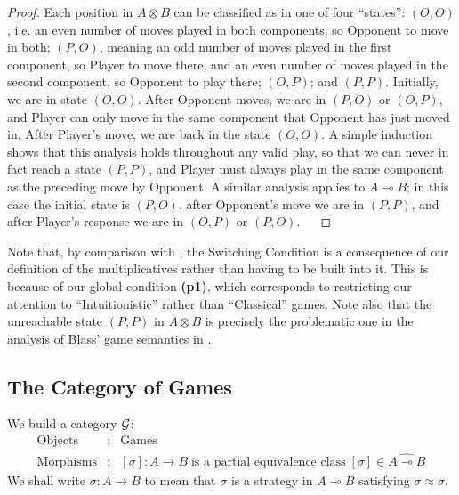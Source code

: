 \documentclass[11pt]{article}
\newcommand{\Fr}{\rightarrow}
\newcommand{\Deq}{\approx}
\newcommand{\Hat}[1]{\widehat{ #1}}
\newcommand{\tensor}{\mbox{$\otimes$}}
\newcommand{\linimpl}{\mbox{$\multimap$}}
\newcommand{\Games}{\mbox{$\cal{G}$}}
\begin{document}
\begin{proof} Each position in $A \tensor B$ can be classified as in
one of four ``states'': $(O, O)$, i.e. an even number of moves
played in both components, so Opponent to move in both; $(P, O)$,
meaning an odd number of moves played in the first component, so
Player to move there, and an even number of moves played in the
second component, so Opponent to play there; $(O, P)$; and $(P,
P)$. Initially, we are in state $(O, O)$. After Opponent moves, we
are in $(P, O)$ or $(O, P)$, and Player can only move in the same
component that Opponent has just moved in. After Player's move, we
are back in the state $(O, O)$. A simple induction shows that this
analysis holds throughout any valid play, so that we can never in
fact reach a state $(P, P)$, and Player must always play in the
same component as the preceding move by Opponent. A similar
analysis applies to $A \linimpl B$; in this case the initial state
is $(P, O)$, after Opponent's move we are in $(P, P)$, and after
Player's response we are in $(O, P)$ or $(P, O)$. $\;\;\; $
\end{proof}

Note that, by comparison with \cite{AbramskyS:gamfcm}, the Switching Condition is
a consequence of our definition of the multiplicatives rather than
having to be built into it.
This is because of our global condition {\bf (p1)}, which corresponds to
restricting our attention to ``Intuitionistic'' rather than ``Classical'' games.
Note also that the unreachable state $(P, P)$ in $A \tensor B$ is precisely
the problematic one in  the analysis of Blass' game semantics in \cite{AbramskyS:gamfcm}.

\subsection{The Category of Games}
We build a category \Games:
\begin{eqnarray*}
\mbox{Objects} &:& \mbox{Games} \\
\mbox{Morphisms} &:& [\sigma]:A\Fr B \; \mbox{is a partial equivalence
  class} \; [\sigma]\in\Hat{A\linimpl B}
\end{eqnarray*}
We shall write $\sigma : A \Fr B$ to mean that $\sigma$ is a strategy in
$A \linimpl B$ satisfying $\sigma \Deq \sigma$.
\end{document}

